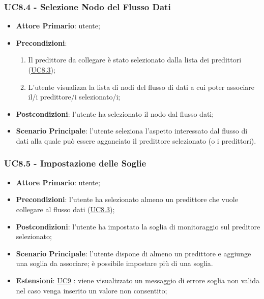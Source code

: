 	\label{par:UC8.4}
	\subsubsection{UC8.4 - Selezione Nodo del Flusso Dati}
		\begin{itemize}
			\item\textbf{Attore Primario}: utente;
			\item\textbf{Precondizioni}:
				\begin{enumerate}
					\item Il predittore da collegare è stato selezionato dalla lista dei predittori (\hyperref[par:UC8.3]{UC8.3});
					\item  L’utente visualizza la lista di nodi del flusso di dati a cui poter associare il/i predittore/i selezionato/i; 
				\end{enumerate}
			\item\textbf{Postcondizioni}: l'utente ha selezionato il nodo dal flusso dati;
			\item\textbf{Scenario Principale}: l’utente seleziona l’aspetto interessato dal flusso di dati alla quale può essere agganciato il predittore selezionato (o i predittori).
		\end{itemize}

	\label{par:UC8.5}
	\subsubsection{UC8.5 - Impostazione delle Soglie}
		\begin{itemize}
			\item\textbf{Attore Primario}: utente;
			\item\textbf{Precondizioni}: l'utente ha selezionato almeno un predittore che vuole collegare al flusso dati (\hyperref[par:UC8.3]{UC8.3});
			\item\textbf{Postcondizioni}: l’utente ha impostato la soglia di monitoraggio sul preditore selezionato;
			\item\textbf{Scenario Principale}: l’utente dispone di almeno un predittore e aggiunge una soglia da associare; è possibile impostare più di una soglia. 
			\item\textbf{Estensioni}: \hyperref[par:UC9]{UC9} : viene visualizzato un messaggio di errore soglia non valida nel caso venga inserito un valore non consentito;	
		\end{itemize}

	\label{par:UC8.6}
